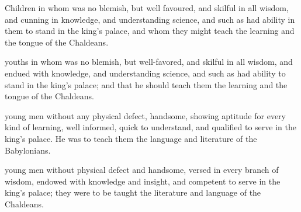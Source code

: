 			Children in whom was no blemish, but well favoured, and skilful in all wisdom, and cunning in knowledge, and understanding science, and such as had ability in them to stand in the king’s palace, and whom they might teach the learning and the tongue of the Chaldeans.

			\begin{versebox}
					\item[BHS] 
					\item[LXX] 
					\item[ASV] youths in whom was no blemish, but well-favored, and skilful in all wisdom, and endued with knowledge, and understanding science, and such as had ability to stand in the king's palace; and that he should teach them the learning and the tongue of the Chaldeans.
					\item[NIV] young men without any physical defect, handsome, showing aptitude for every kind of learning, well informed, quick to understand, and qualified to serve in the king’s palace. He was to teach them the language and literature of the Babylonians.
					\item[NRSV] young men without physical defect and handsome, versed in every branch of wisdom, endowed with knowledge and insight, and competent to serve in the king’s palace; they were to be taught the literature and language of the Chaldeans.
			\end{versebox}

